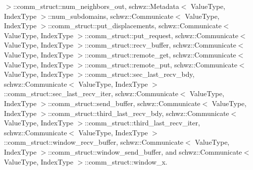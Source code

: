$>$\+::comm\+\_\+struct\+::num\+\_\+neighbors\+\_\+out, schwz\+::\+Metadata$<$ Value\+Type, Index\+Type $>$\+::num\+\_\+subdomains, schwz\+::\+Communicate$<$ Value\+Type, Index\+Type $>$\+::comm\+\_\+struct\+::put\+\_\+displacements, schwz\+::\+Communicate$<$ Value\+Type, Index\+Type $>$\+::comm\+\_\+struct\+::put\+\_\+request, schwz\+::\+Communicate$<$ Value\+Type, Index\+Type $>$\+::comm\+\_\+struct\+::recv\+\_\+buffer, schwz\+::\+Communicate$<$ Value\+Type, Index\+Type $>$\+::comm\+\_\+struct\+::remote\+\_\+get, schwz\+::\+Communicate$<$ Value\+Type, Index\+Type $>$\+::comm\+\_\+struct\+::remote\+\_\+put, schwz\+::\+Communicate$<$ Value\+Type, Index\+Type $>$\+::comm\+\_\+struct\+::sec\+\_\+last\+\_\+recv\+\_\+bdy, schwz\+::\+Communicate$<$ Value\+Type, Index\+Type $>$\+::comm\+\_\+struct\+::sec\+\_\+last\+\_\+recv\+\_\+iter, schwz\+::\+Communicate$<$ Value\+Type, Index\+Type $>$\+::comm\+\_\+struct\+::send\+\_\+buffer, schwz\+::\+Communicate$<$ Value\+Type, Index\+Type $>$\+::comm\+\_\+struct\+::third\+\_\+last\+\_\+recv\+\_\+bdy, schwz\+::\+Communicate$<$ Value\+Type, Index\+Type $>$\+::comm\+\_\+struct\+::third\+\_\+last\+\_\+recv\+\_\+iter, schwz\+::\+Communicate$<$ Value\+Type, Index\+Type $>$\+::comm\+\_\+struct\+::window\+\_\+recv\+\_\+buffer, schwz\+::\+Communicate$<$ Value\+Type, Index\+Type $>$\+::comm\+\_\+struct\+::window\+\_\+send\+\_\+buffer, and schwz\+::\+Communicate$<$ Value\+Type, Index\+Type $>$\+::comm\+\_\+struct\+::window\+\_\+x.

\mbox{\label{classschwz_1_1SolverRAS_a974f6e6be558338a37bdc65f34afdb26}} 
